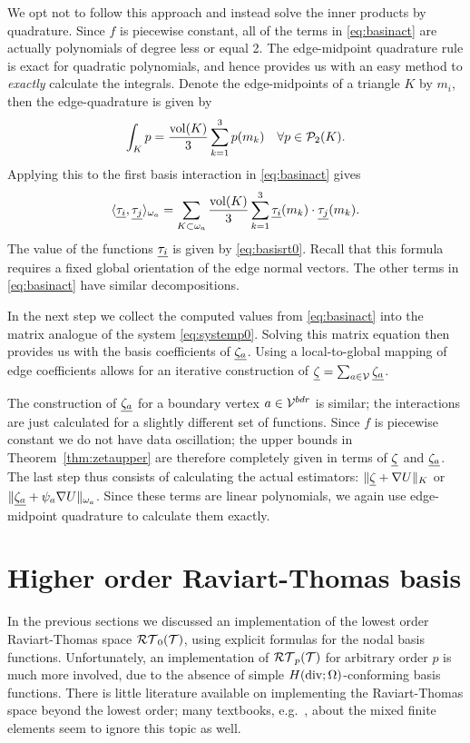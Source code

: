 \documentclass[thesis.tex]{subfiles}
\begin{document}
  We opt not to follow this approach and instead solve the inner products by quadrature. Since  $f$ is piecewise constant, all of the
  terms in \eqref{eq:basinact} are actually polynomials of degree less or equal 2. 
  The edge-midpoint quadrature rule is exact for quadratic polynomials, and hence provides us with an easy
  method to \emph{exactly} calculate the integrals. 
  Denote the edge-midpoints of a triangle $K$ by $m_i$, then the edge-quadrature is given by
  \[
    \int_K p = \frac{\operatorname{vol}(K)}{3} \sum_{k=1}^3 p(m_k)\quad \forall p \in \mathcal{P}_2(K).
  \]
  Applying this to the first basis interaction in \eqref{eq:basinact} gives 
  \[
  \langle \underline{\tau_i}, \underline{\tau_j} \rangle_{\omega_a} = \sum_{K \subset \omega_a} \frac{\operatorname{vol}(K)}{3}\sum_{k=1}^3 \underline{\tau_i}(m_k) \cdot \underline{\tau_j}(m_k).
  \]
  The value of the functions $\underline{\tau_i}$ is given by \eqref{eq:basisrt0}. Recall that this formula
  requires a fixed global orientation of the edge normal vectors.
  The other terms in \eqref{eq:basinact} have similar decompositions.
  
  In the next step we collect the computed values from \eqref{eq:basinact} into the matrix analogue of
  the system \eqref{eq:systemp0}. Solving this matrix equation then provides us with the basis coefficients of $\underline{\zeta_a}$.
  Using a local-to-global mapping of edge coefficients allows for an iterative construction of $\underline{\zeta} = \sum_{a \in \mathcal{V}} \underline{\zeta_a}$. 

  The construction of $\underline{\zeta_a}$ for a boundary vertex $a \in \mathcal{V}^{bdr}$ is similar; the interactions
  are just calculated for a slightly different set of functions. Since $f$ is piecewise constant
  we do not have data oscillation; the upper bounds in Theorem~\ref{thm:zetaupper} are
  therefore completely given in terms of $\underline{\zeta}$ and 
  $\underline{\zeta_a}$. The last step thus consists of calculating the actual estimators:
  $\| \underline{\zeta} + \nabla U \|_K$ or $\| \underline{\zeta_a} + \psi_a \nabla U \|_{\omega_a}$.
  Since these terms are linear polynomials, we again use edge-midpoint quadrature to calculate them exactly.
  
  \section{Higher order Raviart-Thomas basis}
  In the previous sections we discussed an implementation of the lowest order Raviart-Thomas space $\mathcal{RT}_0(\mathcal{T})$,
  using explicit formulas for the nodal basis functions.
  Unfortunately, an implementation of $\mathcal{RT}_p(\mathcal{T})$ for arbitrary order $p$ is much more involved, due to the absence
  of simple $H(\operatorname{div}; \Omega)$-conforming basis functions.
  There is little literature available on implementing the Raviart-Thomas space beyond the lowest
  order; many textbooks, e.g.~\cite{brezzimixed,braess2007finite, gaticasimple}, about the mixed finite elements seem to ignore this 
  topic as well.
\end{document}
